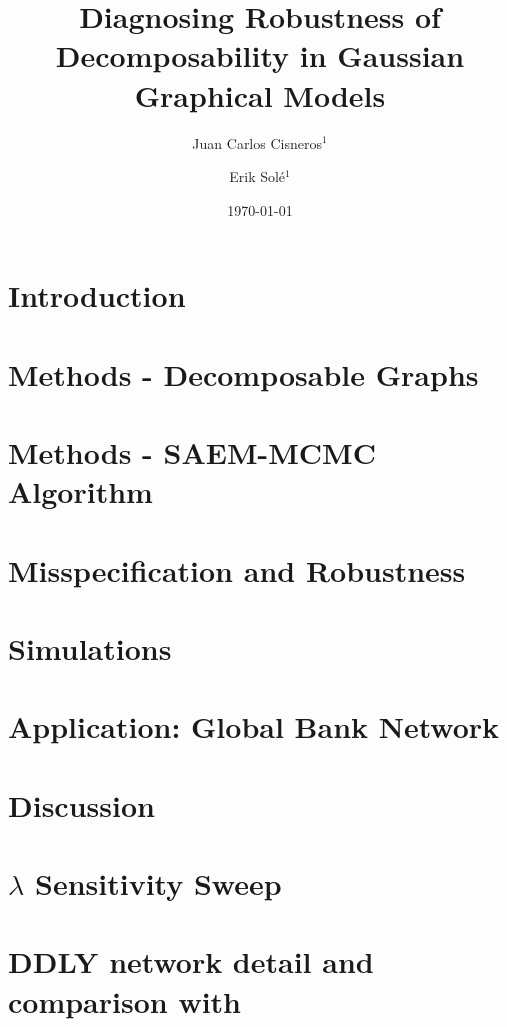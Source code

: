 \documentclass{article}
\title{Diagnosing Robustness of Decomposability in Gaussian Graphical Models}
\author{Juan Carlos Cisneros$^{1}$ \and Erik Solé$^{1}$}
\date{\today}
\begin{document}
\maketitle
{}

\section{Introduction}


\section{Methods - Decomposable Graphs}\label{sec:theory}


\section{Methods - SAEM-MCMC Algorithm}\label{sec:algorithm}


\section{Misspecification and Robustness}\label{sec:misspec}


\section{Simulations}\label{sec:sim}


\section{Application: Global Bank Network}\label{sec:application}


\section{Discussion}\label{sec:discussion}


\newpage
\printbibliography

\newpage
\appendix

\section{$\lambda$ Sensitivity Sweep}\label{sec:lambda}


\section{DDLY network detail and comparison with \textcite{demirer2018estimating}}\label{sec:appendix-ddly}

\end{document}
